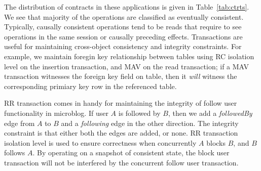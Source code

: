 The distribution of contracts in these applications is given in
Table~\ref{tab:ctrts}. We see that majority of the operations are classified as
eventually consistent. Typically, causally consistent operations tend to be
reads that require to see operations in the same session or causally preceding
effects. Transactions are useful for maintaining cross-object consistency and
integrity constraints. For example, we maintain foregin key relationship
between tables using RC isolation level on the insertion transaction, and MAV
on the read transaction; if a MAV transaction witnesses the foreign key field
on table, then it \emph{will} witness the corresponding primiary key row in the
referenced table.

RR transaction comes in handy for maintaining the integrity of follow user
functionality in microblog. If user $A$ is followed by $B$, then we add a
\emph{followedBy} edge from $A$ to $B$ and a \emph{following} edge in the other
direction. The integrity constraint is that either both the edges are added, or
none. RR transaction isolation level is used to ensure correctness when
concurrently $A$ blocks $B$, and $B$ follows $A$. By operating on a snapshot of
consistent state, the block user transaction will not be interfered by the
concurrent follow user transaction.
